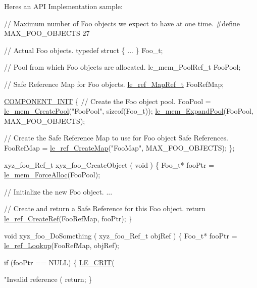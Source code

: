 Here\textquotesingle{}s an A\+P\+I Implementation sample\+:


\begin{DoxyCode}
\textcolor{comment}{// Maximum number of Foo objects we expect to have at one time.}
\textcolor{preprocessor}{#define MAX\_FOO\_OBJECTS  27}

\textcolor{comment}{// Actual Foo objects.}
\textcolor{keyword}{typedef} \textcolor{keyword}{struct}
\{
    ...
\}
Foo\_t;

\textcolor{comment}{// Pool from which Foo objects are allocated.}
le\_mem\_PoolRef\_t FooPool;

\textcolor{comment}{// Safe Reference Map for Foo objects.}
\hyperlink{le__safe_ref_8h_aaf8fb3412fb840cb50366856affaf69b}{le\_ref\_MapRef\_t} FooRefMap;

\hyperlink{le__event_loop_8h_abdb9187a56836a93d19cc793cbd4b7ec}{COMPONENT\_INIT}
\{
    \textcolor{comment}{// Create the Foo object pool.}
    FooPool = \hyperlink{le__mem_8h_ab91efaa2978c9c1c7b2427d25b33241c}{le\_mem\_CreatePool}(\textcolor{stringliteral}{"FooPool"}, \textcolor{keyword}{sizeof}(Foo\_t));
    \hyperlink{le__mem_8h_a79a4321ffa0345f267eaf3b7d3d3528a}{le\_mem\_ExpandPool}(FooPool, MAX\_FOO\_OBJECTS);

    \textcolor{comment}{// Create the Safe Reference Map to use for Foo object Safe References.}
    FooRefMap = \hyperlink{le__safe_ref_8h_a85faf3c75723a1af0e1adf720d9c9dca}{le\_ref\_CreateMap}(\textcolor{stringliteral}{"FooMap"}, MAX\_FOO\_OBJECTS);
\};

xyz\_foo\_Ref\_t xyz\_foo\_CreateObject
(
    \textcolor{keywordtype}{void}
)
\{
    Foo\_t* fooPtr = \hyperlink{le__mem_8h_af7c289c73d4182835a26a9099f3db359}{le\_mem\_ForceAlloc}(FooPool);

    \textcolor{comment}{// Initialize the new Foo object.}
    ...

    \textcolor{comment}{// Create and return a Safe Reference for this Foo object.}
    \textcolor{keywordflow}{return} \hyperlink{le__safe_ref_8h_a458597757cbce48e03413b49f52ec240}{le\_ref\_CreateRef}(FooRefMap, fooPtr);
\}

\textcolor{keywordtype}{void} xyz\_foo\_DoSomething
(
    xyz\_foo\_Ref\_t objRef
)
\{
    Foo\_t* fooPtr = \hyperlink{le__safe_ref_8h_a488dddfd579f4a20f39be392c4d7d2e0}{le\_ref\_Lookup}(FooRefMap, objRef);

    \textcolor{keywordflow}{if} (fooPtr == NULL)
    \{
        \hyperlink{le__log_8h_a5efa1e4b6292c820c8555b4066a5c10d}{LE\_CRIT}(\textcolor{stringliteral}{"Invalid reference (%
        \textcolor{keywordflow}{return};
    \}

}
\end{DoxyCode}
